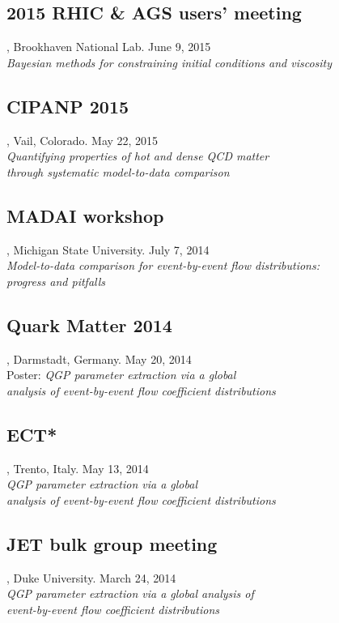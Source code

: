\documentclass[letterpaper,10pt]{article}
\begin{document}
\subsection{2015 RHIC \& AGS users' meeting}, Brookhaven National Lab. \hfill June 9, 2015 \\
\emph{Bayesian methods for constraining initial conditions and viscosity}

\subsection{CIPANP 2015}, Vail, Colorado. \hfill May 22, 2015 \\
\emph{Quantifying properties of hot and dense QCD matter \\ through systematic model-to-data comparison}

\subsection{MADAI workshop}, Michigan State University. \hfill July 7, 2014 \\
\emph{Model-to-data comparison for event-by-event flow distributions: \\ progress and pitfalls}

\subsection{Quark Matter 2014}, Darmstadt, Germany. \hfill May 20, 2014 \\
Poster: \emph{QGP parameter extraction via a global \\ analysis of event-by-event flow coefficient distributions}

\subsection{ECT*}, Trento, Italy. \hfill May 13, 2014 \\
\emph{QGP parameter extraction via a global \\ analysis of event-by-event flow coefficient distributions}

\subsection{JET bulk group meeting}, Duke University. \hfill March 24, 2014 \\
\emph{QGP parameter extraction via a global analysis of \\ event-by-event flow coefficient distributions}
\end{document}
